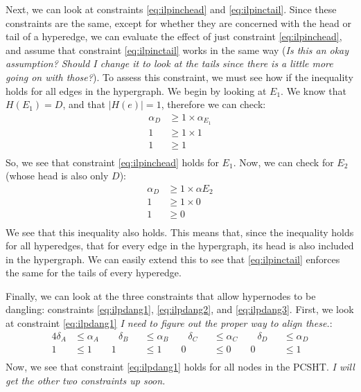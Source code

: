 \documentclass[12pt,twoside]{reedthesis}
\theoremstyle{definition}
\begin{document}
Next, we can look at constraints \eqref{eq:ilpinchead} and \eqref{eq:ilpinctail}. Since these constraints are the same, except for whether they are concerned with the head or tail of a hyperedge, we can evaluate the effect of just constraint \eqref{eq:ilpinchead}, and assume that constraint \eqref{eq:ilpinctail} works in the same way (\emph{Is this an okay assumption? Should I change it to look at the tails since there is a little more going on with those?}). To assess this constraint, we must see how if the inequality holds for all edges in the hypergraph. We begin by looking at $E_1$. We know that $H({E_1})=D$, and that $\lvert H(e) \rvert = 1$, therefore we can check:
\begin{align*}
  \alpha_D &\geq 1 \times \alpha_{E_1}\\
  1 &\geq 1 \times 1\\
  1 &\geq 1\\
\end{align*}%
So, we see that constraint \eqref{eq:ilpinchead} holds for $E_1$. Now, we can check for $E_2$ (whose head is also only $D$):
\begin{align*}
  \alpha_D &\geq 1 \times \alpha{E_2}\\
  1 &\geq 1 \times 0\\
  1 &\geq 0\\
\end{align*}%
We see that this inequality also holds. This means that, since the inequality holds for all hyperedges, that for every edge in the hypergraph, its head is also included in the hypergraph. We can easily extend this to see that \eqref{eq:ilpinctail} enforces the same for the tails of every hyperedge.\par

Finally, we can look at the three constraints that allow hypernodes to be dangling: constraints \eqref{eq:ilpdang1}, \eqref{eq:ilpdang2}, and \eqref{eq:ilpdang3}. First, we look at constraint \eqref{eq:ilpdang1} \emph{I need to figure out the proper way to align these.}:
\begin{alignat*}{4}
  \delta_A &\leq \alpha_A \qquad \delta_B &&\leq \alpha_B \qquad \delta_C &&\leq \alpha_C \qquad \delta_D &&\leq \alpha_D\\
  1 &\leq 1 \qquad 1 &&\leq 1 \qquad 0 &&\leq 0 \qquad 0 &&\leq 1\\
\end{alignat*}
Now, we see that constraint \eqref{eq:ilpdang1} holds for all nodes in the PCSHT. \emph{I will get the other two constraints up soon.}\par
\end{document}

